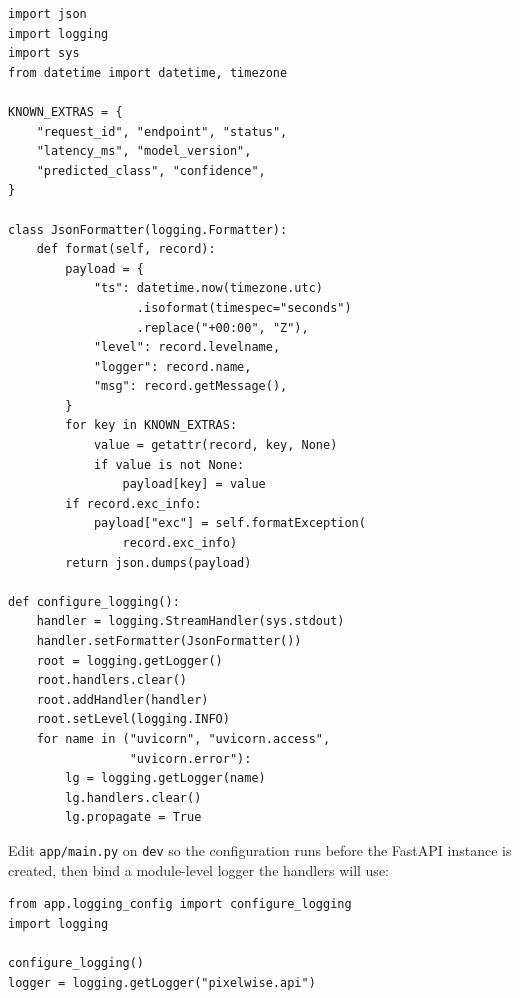 \begin{verbatim}
import json
import logging
import sys
from datetime import datetime, timezone

KNOWN_EXTRAS = {
    "request_id", "endpoint", "status",
    "latency_ms", "model_version",
    "predicted_class", "confidence",
}

class JsonFormatter(logging.Formatter):
    def format(self, record):
        payload = {
            "ts": datetime.now(timezone.utc)
                  .isoformat(timespec="seconds")
                  .replace("+00:00", "Z"),
            "level": record.levelname,
            "logger": record.name,
            "msg": record.getMessage(),
        }
        for key in KNOWN_EXTRAS:
            value = getattr(record, key, None)
            if value is not None:
                payload[key] = value
        if record.exc_info:
            payload["exc"] = self.formatException(
                record.exc_info)
        return json.dumps(payload)

def configure_logging():
    handler = logging.StreamHandler(sys.stdout)
    handler.setFormatter(JsonFormatter())
    root = logging.getLogger()
    root.handlers.clear()
    root.addHandler(handler)
    root.setLevel(logging.INFO)
    for name in ("uvicorn", "uvicorn.access",
                 "uvicorn.error"):
        lg = logging.getLogger(name)
        lg.handlers.clear()
        lg.propagate = True
\end{verbatim}


 Edit
\texttt{app/main.py} on \texttt{dev} so the configuration runs before
the FastAPI instance is created, then bind a module-level logger the
handlers will use:

\begin{verbatim}
from app.logging_config import configure_logging
import logging

configure_logging()
logger = logging.getLogger("pixelwise.api")
\end{verbatim}

